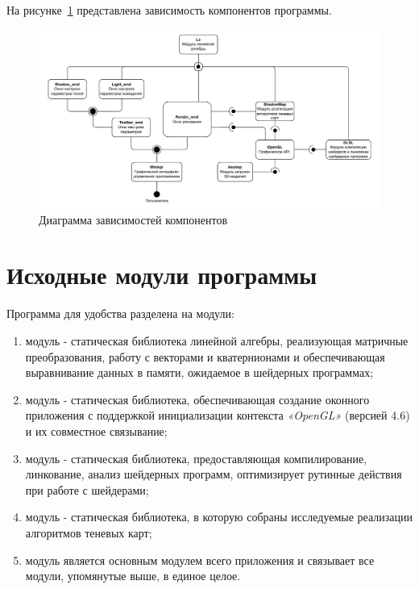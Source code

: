 На рисунке~\ref{chart:appuml} представлена зависимость компонентов программы.

\begin{figure}[h]
    \centering
    \includegraphics[width=\textwidth]{charts/AppUml.pdf}
    \caption{Диаграмма зависимостей компонентов}
    \label{chart:appuml}
\end{figure}
\FloatBarrier

\section{Исходные модули программы}

Программа для удобства разделена на модули:

\begin{enumerate}[label=\arabic*), labelsep=0.5em]
    \item модуль  - статическая библиотека линейной алгебры, реализующая
    матричные преобразования, работу с векторами и кватернионами и обеспечивающая
    выравнивание данных в памяти, ожидаемое в шейдерных программах;
    \item модуль  - статическая библиотека, обеспечивающая создание
    оконного приложения с поддержкой инициализации контекста \textit{«OpenGL»} (версией 4.6)
    и их совместное связывание;
    \item модуль  - статическая библиотека, предоставляющая компилирование, линкование,
    анализ шейдерных программ, оптимизирует рутинные действия при работе с шейдерами;
    \item модуль  - статическая библиотека, в которую собраны исследуемые реализации
    алгоритмов теневых карт;
    \item модуль  является основным модулем всего приложения и связывает все
    модули, упомянутые выше, в единое целое.
\end{enumerate}

